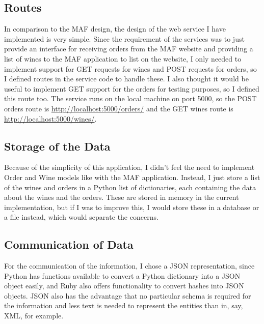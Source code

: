 \documentclass[a4paper,12pt,hidelinks]{report}
\begin{document}
    \subsection{Routes}
    In comparison to the MAF design, the design of the web service I have implemented is very simple. Since the requirement of the services was
    to just provide an interface for receiving orders from the MAF website and providing a list of wines to the MAF application to list on the website,
    I only needed to implement support for GET requests for wines and POST requests for orders, so I defined routes in the service code to handle these.
    I also thought it would be useful to implement GET support for the orders for testing purposes, so I defined this route too. The service runs on
    the local machine on port 5000, so the POST orders route is \url{http://localhost:5000/orders/} and the GET wines route is \url{http://localhost:5000/wines/}.

    \subsection{Storage of the Data}
    Because of the simplicity of this application, I didn't feel the need to implement Order and Wine models like with the MAF application. Instead,
    I just store a list of the wines and orders in a Python list of dictionaries, each containing the data about the wines and the orders. These are stored
    in memory in the current implementation, but if I was to improve this, I would store these in a database or a file instead, which would separate the
    concerns.
    
    \subsection{Communication of Data}
    For the communication of the information, I chose a JSON representation, since Python has functions available to convert a Python dictionary into
    a JSON object easily, and Ruby also offers functionality to convert hashes into JSON objects. JSON also has the advantage that no particular
    schema is required for the information and less text is needed to represent the entities than in, say, XML, for example.
\end{document}
